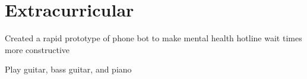 \documentclass[]{deedy-resume-openfont}
\begin{document}
\begin{minipage}[t]{0.95\textwidth}




\section{Extracurricular}

\begin{tightemize}
\item Created a rapid prototype of phone bot to make mental health hotline wait times more constructive
\end{tightemize}
\sectionsep

\begin{tightemize}
\item Play guitar, bass guitar, and piano 
\end{tightemize}
\sectionsep






\end{minipage}
\end{document}
